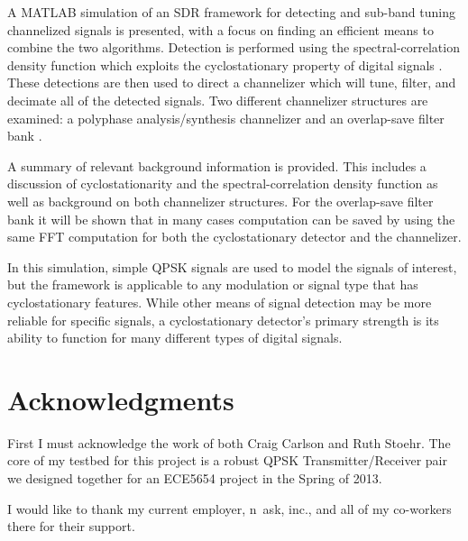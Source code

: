\documentclass[12pt]{report}
\begin{document}
A MATLAB simulation of an SDR framework for detecting and sub-band tuning
channelized signals is presented, with a focus on finding an efficient means to
combine the two algorithms. Detection is performed using the
spectral-correlation density function which exploits the cyclostationary
property of digital signals \cite{Gardner1}.  These detections are then used to
direct a channelizer which will tune, filter, and decimate all of the detected
signals. Two different channelizer structures are examined: a polyphase
analysis/synthesis channelizer \cite{Harris1} and an overlap-save filter bank
\cite{Borgerding1}.

A summary of relevant background information is provided.  This includes
a discussion of cyclostationarity and the spectral-correlation density function
as well as background on both channelizer structures. For the overlap-save
filter bank it will be shown that in many cases computation can be saved by
using the same FFT computation for both the cyclostationary detector and the
channelizer.

In this simulation, simple QPSK signals are used to model the signals of
interest, but the framework is applicable to any modulation or signal type that
has cyclostationary features. While other means of signal detection may be more
reliable for specific signals, a cyclostationary detector's primary strength is
its ability to function for many different types of digital signals.


\vfill



\pagebreak

\chapter*{Acknowledgments}
First I must acknowledge the work of both Craig Carlson and Ruth Stoehr.
The core of my testbed for this project is a robust QPSK Transmitter/Receiver
pair we designed together for an ECE5654 project in the Spring of 2013.

I would like to thank my current employer, n~ask, inc., and all of my
co-workers there for their support.
\end{document}
